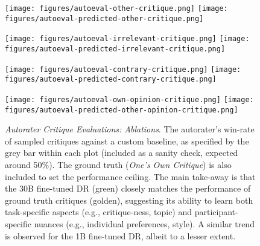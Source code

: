 \begin{figure}[H]
\centerline{
\texttt{[image: figures/autoeval-other-critique.png]}
\texttt{[image: figures/autoeval-predicted-other-critique.png]}
}
\centerline{
\texttt{[image: figures/autoeval-irrelevant-critique.png]}
\texttt{[image: figures/autoeval-predicted-irrelevant-critique.png]}
}
\centerline{
\texttt{[image: figures/autoeval-contrary-critique.png]}
\texttt{[image: figures/autoeval-predicted-contrary-critique.png]}
}
\centerline{
\texttt{[image: figures/autoeval-own-opinion-critique.png]}
\texttt{[image: figures/autoeval-predicted-other-opinion-critique.png]}
}
\caption{\textit{Autorater Critique Evaluations: Ablations}. The autorater's win-rate of sampled critiques against a custom baseline, as specified by the grey bar within each plot (included as a sanity check, expected around 50\%). The ground truth (\textit{One's Own Critique}) is also included to set the performance ceiling. The main take-away is that the 30B fine-tuned DR (green) closely matches the performance of ground truth critiques (golden), suggesting its ability to learn both task-specific aspects (e.g., critique-ness, topic) and participant-specific nuances (e.g., individual preferences, style). A similar trend is observed for the 1B fine-tuned DR, albeit to a lesser extent.}
\label{fig:autoeval-critiques}
\end{figure}

~

